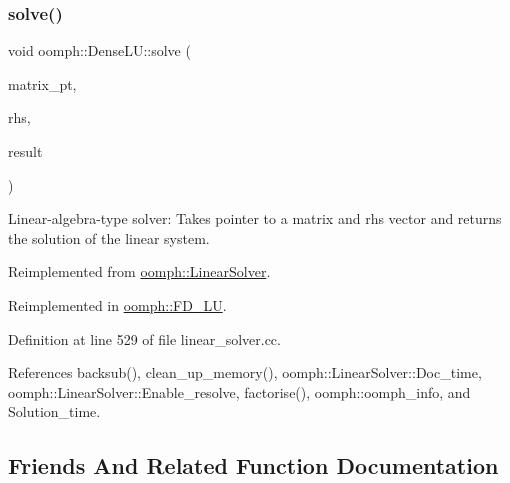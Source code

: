 \mbox{\label{classoomph_1_1DenseLU_a1d79cf13a269733d655e3e90c447f84d}} 
\subsubsection{\texorpdfstring{solve()}{solve()}\hspace{0.1cm}{\footnotesize\ttfamily [3/3]}}
{\footnotesize\ttfamily void oomph\+::\+Dense\+L\+U\+::solve (\begin{DoxyParamCaption}\item[{\hyperlink{classoomph_1_1DoubleMatrixBase}{Double\+Matrix\+Base} $\ast$const \&}]{matrix\+\_\+pt,  }\item[{const \hyperlink{classoomph_1_1Vector}{Vector}$<$ double $>$ \&}]{rhs,  }\item[{\hyperlink{classoomph_1_1Vector}{Vector}$<$ double $>$ \&}]{result }\end{DoxyParamCaption})\hspace{0.3cm}{\ttfamily [virtual]}}



Linear-\/algebra-\/type solver\+: Takes pointer to a matrix and rhs vector and returns the solution of the linear system. 



Reimplemented from \hyperlink{classoomph_1_1LinearSolver_a1f7a2ee2cd18d3dafc20a61ca2f52dbb}{oomph\+::\+Linear\+Solver}.



Reimplemented in \hyperlink{classoomph_1_1FD__LU_a2a44542b29faa39f1b816dc80da9eba1}{oomph\+::\+F\+D\+\_\+\+LU}.



Definition at line 529 of file linear\+\_\+solver.\+cc.



References backsub(), clean\+\_\+up\+\_\+memory(), oomph\+::\+Linear\+Solver\+::\+Doc\+\_\+time, oomph\+::\+Linear\+Solver\+::\+Enable\+\_\+resolve, factorise(), oomph\+::oomph\+\_\+info, and Solution\+\_\+time.



\subsection{Friends And Related Function Documentation}
\mbox{\label{classoomph_1_1DenseLU_a6140531810d729d53113b6ac65193197}} 
